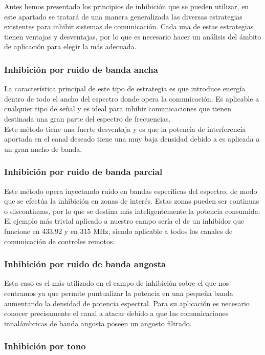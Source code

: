 \documentclass[12pt]{report}
\begin{document}
Antes hemos presentado los principios de inhibición que se pueden utilizar, en este apartado se tratará de una manera generalizada las diversas 
estrategias existentes para inhibir sistemas de comunicación. Cada una de estas estrategias tienen ventajas y desventajas, por lo que es necesario
hacer un análisis del ámbito de aplicación para elegir la más adecuada.


\subsubsection{Inhibición por ruido de banda ancha}

La característica principal de este tipo de estrategia es que introduce energía dentro de todo el ancho del espectro donde opera la comunicación.
Es aplicable a cualquier tipo de señal y es ideal para inhibir comunicaciones que tienen destinada una gran parte del espectro de frecuencias.\\
Este método tiene una fuerte desventaja y es que la potencia de interferencia aportada en el canal deseado tiene una muy baja densidad debido 
a es aplicada a un gran ancho de banda.

\subsubsection{Inhibición por ruido de banda parcial}

Este método opera inyectando ruido en bandas específicas del espectro, de modo que se efectúa la  inhibición en zonas de interés. Estas zonas 
pueden ser continuas o discontinuas, por lo que se destina más inteligentemente la potencia consumida. El ejemplo más trivial aplicado a nuestro
campo sería el de un inhibidor que funcione en 433,92 y en 315 MHz, siendo  aplicable a todos los canales de comunicación de controles remotos.

\subsubsection{Inhibición por ruido de banda angosta}

Esta caso es el más utilizado en el campo de inhibición sobre el que nos centramos ya que permite puntualizar la potencia en una pequeña
banda aumentando la densidad de potencia espectral. Para su aplicación es necesario conocer precisamente el canal a atacar debido a que las 
comunicaciones innalámbricas de banda angosta poseen un angosto filtrado.

\subsubsection{Inhibición por tono}
\end{document}
